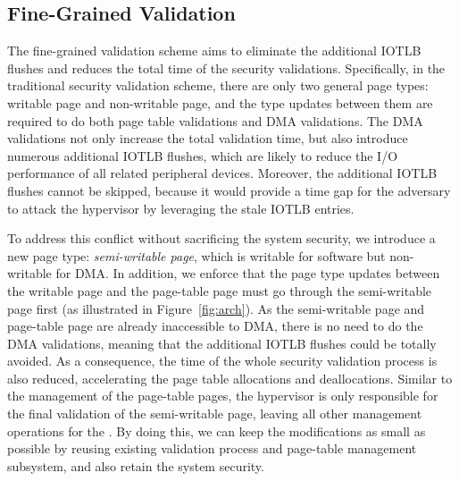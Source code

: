 \subsection{Fine-Grained Validation}\label{sec:fine-grained}
The fine-grained validation scheme aims to eliminate the additional IOTLB flushes and reduces the total time of the security validations.
Specifically, in the traditional security validation scheme, there are only two general page types: writable page and non-writable page,
and the type updates between them are required to do both page table validations and DMA validations.
The DMA validations not only increase the total validation time, but also introduce numerous additional IOTLB flushes, which are likely to reduce the I/O performance of all related peripheral devices.
Moreover, the additional IOTLB flushes cannot be skipped, because it would provide a time gap for the adversary to attack the hypervisor by leveraging the stale IOTLB entries.

To address this conflict without sacrificing the system security, we introduce a new page type: \emph{semi-writable page}, which is writable for software but non-writable for DMA.
In addition, we enforce that the page type updates between the writable page and the page-table page must go through the semi-writable page first (as illustrated in Figure~\ref{fig:arch}).
As the semi-writable page and page-table page are already inaccessible to DMA, there is no need to do the DMA validations, meaning that the additional IOTLB flushes could be totally avoided.
As a consequence, the time of the whole security validation process is also reduced, accelerating the page table allocations and deallocations.
Similar to the management of the page-table pages, the hypervisor is only responsible for the final validation of the semi-writable page, leaving all other management operations for the \cache.
By doing this, we can keep the modifications as small as possible by reusing existing validation process and page-table management subsystem, and also retain the system security.


